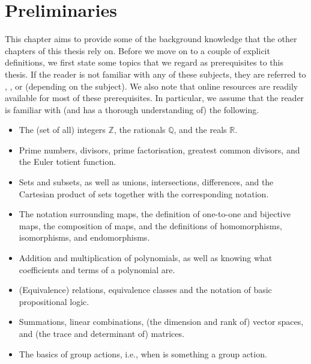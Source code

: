 \documentclass[openany, a4paper, 10pt]{book}
\theoremstyle{plain}
\theoremstyle{plain}
\theoremstyle{plain}
\theoremstyle{definition}
\theoremstyle{plain}
\theoremstyle{definition}
\theoremstyle{remark}
\begin{document}
{
    \hypersetup{linkcolor=black}
    \tableofcontents
}


\setcounter{chapter}{-1}
\chapter{Preliminaries}\label{chap:prelim}
This chapter aims to provide some of the background knowledge that the other chapters of this thesis rely on.
Before we move on to a couple of explicit definitions, we first state some topics that we regard as prerequisites to this thesis.
If the reader is not familiar with any of these subjects, they are referred to \cite{dictaat_dion}, \cite{dictaat_algebra_1}, or \cite{analysis} (depending on the subject).
We also note that online resources are readily available for most of these prerequisites.
In particular, we assume that the reader is familiar with (and has a thorough understanding of) the following.
\begin{itemize}
    \item The (set of all) integers $\mathbb Z$, the rationals $\mathbb Q$, and the reals $\mathbb R$.
    \item Prime numbers, divisors, prime factorisation, greatest common divisors, and the Euler totient function.
    \item Sets and subsets, as well as unions, intersections, differences, and the Cartesian product of sets together with the corresponding notation.
    \item The notation surrounding maps, the definition of one-to-one and bijective maps, the composition of maps, and the definitions of homomorphisms, isomorphisms, and endomorphisms.
    \item Addition and multiplication of polynomials, as well as knowing what coefficients and terms of a polynomial are.
    \item (Equivalence) relations, equivalence classes and the notation of basic propositional logic.
    \item Summations, linear combinations, (the dimension and rank of) vector spaces, and (the trace and determinant of) matrices.
    \item The basics of group actions, i.e., when is something a group action.
\end{itemize}
\end{document}
